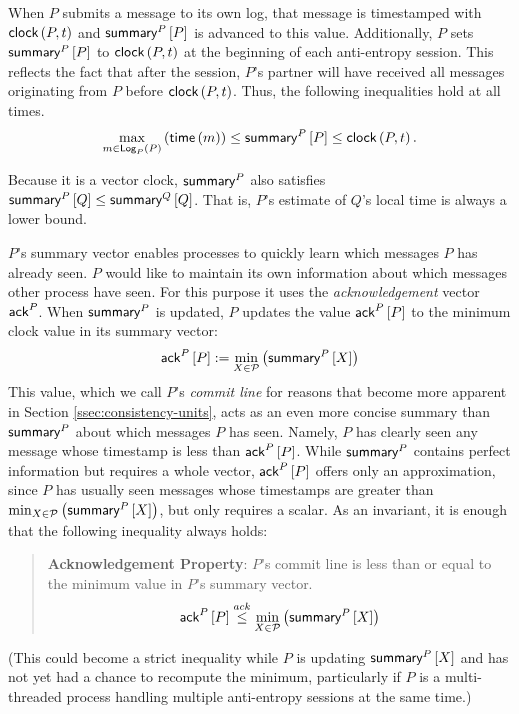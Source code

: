 \documentclass[]             %
{NASA}                       %
\theoremstyle{definition}
\begin{document}

When $P$ submits a message to its own log, that message is timestamped
with $\textsf{clock}\left(P, t\right)$ and $\textsf{summary}^{P}\left[P\right]$ is advanced to this
value. Additionally, $P$ sets $\textsf{summary}^{P}\left[P\right]$ to $\textsf{clock}\left(P,t\right)$ at the
beginning of each anti-entropy session. This reflects the fact that
after the session, $P$'s partner will have received all messages
originating from $P$ before $\textsf{clock}\left(P,t\right)$. Thus, the following
inequalities hold at all times.
\[
  \max_{m \in \textsf{Log}_{P}\left(P\right)}\left({\mathsf{time}\left(m\right)}\right) \leq \textsf{summary}^{P}\left[P\right] \leq \textsf{clock}\left(P,t\right).
\]

Because it is a vector clock, $\textsf{summary}^{P}$ also satisfies
$\textsf{summary}^{P}\left[Q\right] \leq \textsf{summary}^{Q}\left[Q\right]$. That is, $P$'s estimate of $Q$'s
local time is always a lower bound.

$P$'s summary vector enables processes to quickly learn which messages
$P$ has already seen. $P$ would like to maintain its own information
about which messages other process have seen. For this purpose it uses
the \emph{acknowledgement} vector $\textsf{ack}^{P}$. When $\textsf{summary}^{P}$
is updated, $P$ updates the value $\textsf{ack}^{P}\left[P\right]$ to the minimum clock
value in its summary vector:
\[\textsf{ack}^{P}\left[P\right] := \min_{X \in \mathcal{P}} \left(\textsf{summary}^{P}\left[X\right]\right)\]
This value, which we call $P$'s \emph{commit line} for reasons that
become more apparent in Section \ref{ssec:consistency-units}, acts as
an even more concise summary than $\textsf{summary}^{P}$ about which
messages $P$ has seen. Namely, $P$ has clearly seen any message whose
timestamp is less than $\textsf{ack}^{P}\left[P\right]$. While $\textsf{summary}^{P}$ contains
perfect information but requires a whole vector, $\textsf{ack}^{P}\left[P\right]$ offers
only an approximation, since $P$ has usually seen messages whose
timestamps are greater than
$\min_{X \in \mathcal{P}} \left(\textsf{summary}^{P}\left[X\right]\right)$, but only requires
a scalar. As an invariant, it is enough that the following inequality
always holds:
\begin{quote}
\textbf{Acknowledgement Property}: $P$'s commit line is less than or equal to the minimum value in $P$'s summary vector.
\[ \textsf{ack}^{P}\left[P\right] \overset{ack}{\leq} \min_{X \in \mathcal{P}} \left(\textsf{summary}^{P}\left[X\right]\right)\]
\end{quote}
(This could become a strict inequality while $P$ is updating
$\textsf{summary}^{P}\left[X\right]$ and has not yet had a chance to recompute the
minimum, particularly if $P$ is a multi-threaded process handling
multiple anti-entropy sessions at the same time.)
\end{document}
